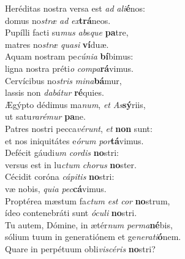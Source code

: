 \evenverse Heréditas nostra versa est \textit{ad} \textit{a}\textit{li}\textbf{é}nos:~\*\\
\evenverse domus no\textit{stræ} \textit{ad} \textit{ex}\textbf{trá}neos.\\
\oddverse Pupílli facti su\textit{mus} \textit{ab}s\textit{que} \textbf{pa}tre,~\*\\
\oddverse matres no\textit{stræ} \textit{qua}\textit{si} \textbf{ví}duæ.\\
\evenverse Aquam nostram pe\textit{cú}\textit{ni}\textit{a} \textbf{bí}bimus:~\*\\
\evenverse ligna nostra préti\textit{o} \textit{com}\textit{pa}\textbf{rá}vimus.\\
\oddverse Cervícibus no\textit{stris} \textit{mi}\textit{na}\textbf{bá}mur,~\*\\
\oddverse lassis non \textit{da}\textit{bá}\textit{tur} \textbf{ré}quies.\\
\evenverse Ægýpto dédimus ma\textit{num}, \textit{et} \textit{As}\textbf{sý}riis,~\*\\
\evenverse ut satu\textit{ra}\textit{ré}\textit{mur} \textbf{pa}ne.\\
\oddverse Patres nostri pecca\textit{vé}\textit{runt}, \textit{et} \textbf{non} sunt:~\*\\
\oddverse et nos iniquitátes e\textit{ó}\textit{rum} \textit{por}\textbf{tá}vimus.\\
\evenverse Defécit gáudi\textit{um} \textit{cor}\textit{dis} \textbf{no}stri:~\*\\
\evenverse versus est in lu\textit{ctum} \textit{cho}\textit{rus} \textbf{no}ster.\\
\oddverse Cécidit coróna \textit{cá}\textit{pi}\textit{tis} \textbf{no}stri:~\*\\
\oddverse væ nobis, \textit{qui}\textit{a} \textit{pec}\textbf{cá}vimus.\\
\evenverse Proptérea mæstum fa\textit{ctum} \textit{est} \textit{cor} \textbf{no}strum,~\*\\
\evenverse ídeo contenebráti sunt \textit{ó}\textit{cu}\textit{li} \textbf{no}stri.\\
\oddverse Tu autem, Dómine, in ætér\textit{num} \textit{per}\textit{ma}\textbf{né}bis,~\*\\
\oddverse sólium tuum in generatiónem et ge\textit{ne}\textit{ra}\textit{ti}\textbf{ó}nem.\\
\evenverse Quare in perpétuum obli\textit{vi}\textit{scé}\textit{ris} \textbf{no}stri?~\*\\
